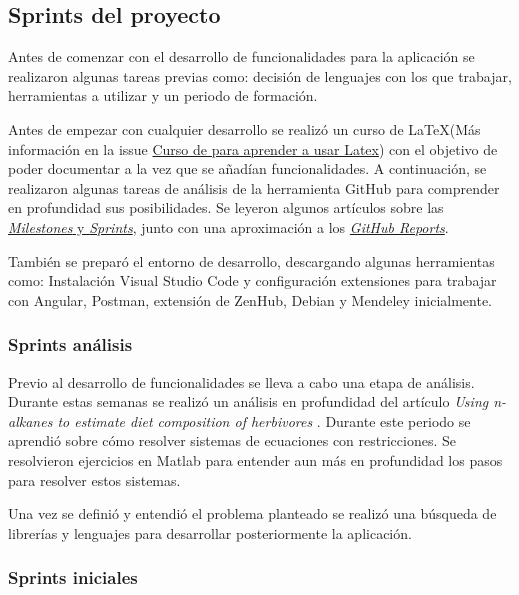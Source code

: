 \subsection{Sprints del proyecto}

Antes de comenzar con el desarrollo de funcionalidades para la aplicación se realizaron algunas tareas previas como: decisión de lenguajes con los que trabajar, herramientas a utilizar y un periodo de formación.

Antes de empezar con cualquier desarrollo se realizó un curso de \LaTeX (Más información en la issue \href{https://github.com/humbertoms99/Mixing_models/issues/1}{Curso de para aprender a usar Latex}) con el objetivo de poder documentar a la vez que se añadían funcionalidades. A continuación, se realizaron algunas tareas de análisis de la herramienta GitHub para comprender en profundidad sus posibilidades. Se leyeron algunos artículos sobre las \href{https://github.com/humbertoms99/Mixing_models/issues/2}{\textit{Milestones} y \textit{Sprints}}, junto con una aproximación a los \href{https://github.com/humbertoms99/Mixing_models/issues/3}{\textit{GitHub Reports}}.

También se preparó el entorno de desarrollo, descargando algunas herramientas como: Instalación Visual Studio Code y configuración extensiones para trabajar con Angular, Postman, extensión de ZenHub, Debian y Mendeley inicialmente.

\subsubsection{Sprints análisis}

Previo al desarrollo de funcionalidades se lleva a cabo una etapa de análisis. Durante estas semanas se realizó un análisis en profundidad del artículo \textit{Using n-alkanes to estimate diet composition of herbivores} \cite{problemn-alkanes2007}. Durante este periodo se aprendió sobre cómo resolver sistemas de ecuaciones con restricciones. Se resolvieron ejercicios en Matlab para entender aun más en profundidad los pasos para resolver estos sistemas. 

Una vez se definió y entendió el problema planteado se realizó una búsqueda de librerías y lenguajes para desarrollar posteriormente la aplicación.  

\subsubsection{Sprints iniciales}

